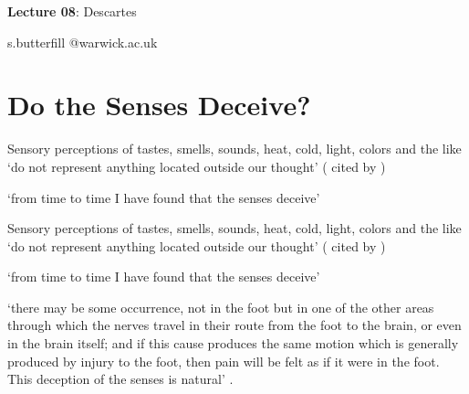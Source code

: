 \documentclass[12pt]{extarticle}
\date{}
\makeatletter
\def \ititle {Descartes}
\def \isubtitle {Lecture 02}
\def \iemail{s.butterfill @warwick.ac.uk}
\makeatother
\begin{document}
\begin{multicols*}{3}

\setlength\footnotesep{1em}








      
\def \ititle {Lecture 08}
 
\def \isubtitle {Descartes}
 
\begin{center}
 
{\Large
 
\textbf{\ititle}: \isubtitle
 
}
 
 
 
\iemail %
 
\end{center}
 
 
 
\section{Do the Senses Deceive?}
 
Sensory perceptions of tastes,
smells, sounds, heat, cold, light, colors and the like ‘do not represent
anything located outside our thought’
(\citealp[p.~ 219, AT VIII:35]{descartes:1985_csm1} cited by \citealp[p.~348]{simmons:1999_are})
 
‘from time to time I have found that the senses deceive’
\citep[p.~17, AT VII:18]{descartes:1985_csm2}
 
Sensory perceptions of tastes,
smells, sounds, heat, cold, light, colors and the like ‘do not represent
anything located outside our thought’
(\citealp[p.~ 219, AT VIII:35]{descartes:1985_csm1} cited by \citealp[p.~348]{simmons:1999_are})
 
‘from time to time I have found that the senses deceive’
\citep[p.~17, AT VII:18]{descartes:1985_csm2}
 
‘there may be some occurrence, not in the foot but in one of the other
areas through which the nerves travel in their route from the foot to the
brain, or even in the brain itself; and if this cause produces the same
motion which is generally produced by injury to the foot, then pain will be
felt as if it were in the foot. This deception of the senses is natural’
\citep[p.~61, AT VII:88]{descartes:1985_csm2}.
 

\end{multicols*}
\end{document}
